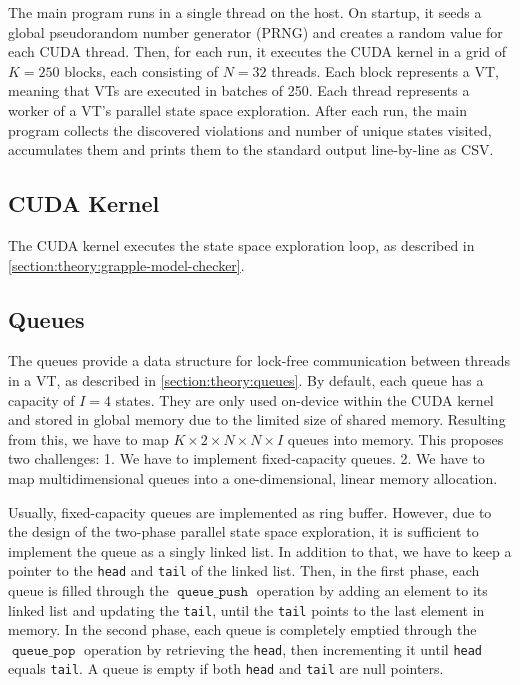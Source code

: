 \documentclass[
fancyheadings, %
%
%
]{stsreprt}
\DeclareMathOperator{\qPop}{\texttt{queue\_pop}}
\DeclareMathOperator{\qPush}{\texttt{queue\_push}}
\begin{document}
The main program runs in a single thread on the host.
On startup, it seeds a global pseudorandom number generator (PRNG) and creates a random value for each CUDA thread.
Then, for each run, it executes the CUDA kernel in a grid of $K=250$ blocks, each consisting of $N=32$ threads.
Each block represents a VT, meaning that VTs are executed in batches of 250.
Each thread represents a worker of a VT's parallel state space exploration.
After each run, the main program collects the discovered violations and number of unique states visited, accumulates them and prints them to the standard output line-by-line as CSV.

\subsection{CUDA Kernel}

The CUDA kernel executes the state space exploration loop, as described in \cref{section:theory:grapple-model-checker}.


\subsection{Queues}

The queues provide a data structure for lock-free communication between threads in a VT, as described in \cref{section:theory:queues}.
By default, each queue has a capacity of $I=4$ states.
They are only used on-device within the CUDA kernel and stored in global memory due to the limited size of shared memory.
Resulting from this, we have to map $K \times 2 \times N \times N \times I$ queues into memory.
This proposes two challenges:
1. We have to implement fixed-capacity queues.
2. We have to map multidimensional queues into a one-dimensional, linear memory allocation.

Usually, fixed-capacity queues are implemented as ring buffer.
However, due to the design of the two-phase parallel state space exploration, it is sufficient to implement the queue as a singly linked list.
In addition to that, we have to keep a pointer to the \texttt{head} and \texttt{tail} of the linked list.
Then, in the first phase, each queue is filled through the $\qPush$ operation by adding an element to its linked list and updating the \texttt{tail}, until the \texttt{tail} points to the last element in memory.
In the second phase, each queue is completely emptied through the $\qPop$ operation by retrieving the \texttt{head}, then incrementing it until \texttt{head} equals \texttt{tail}.
A queue is empty if both \texttt{head} and \texttt{tail} are null pointers.
\end{document}
